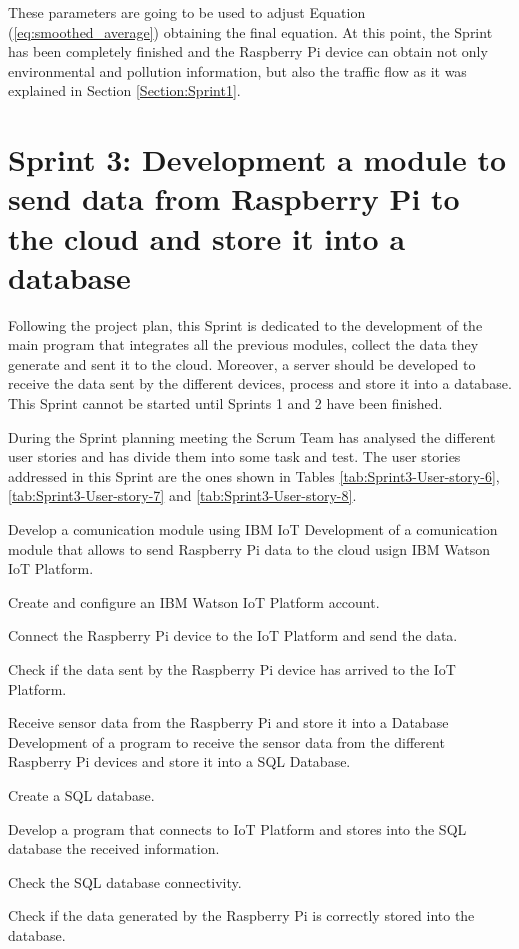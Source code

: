 These parameters are going to be used to adjust Equation (\ref{eq:smoothed_average}) obtaining the final equation. At this point, the Sprint has been completely finished and the Raspberry Pi device can obtain not only environmental and pollution information, but also the traffic flow as it was explained in Section \ref{Section:Sprint1}.


\section{Sprint 3: Development a module to send data from Raspberry Pi to the cloud and store it into a database}
Following the project plan, this Sprint is dedicated to the development of the main program that integrates all the previous modules, collect the data they generate and sent it to the cloud. Moreover, a server should be developed to receive the data sent by the different devices, process and store it into a database. This Sprint cannot be started until Sprints 1 and 2 have been finished.

During the Sprint planning meeting the Scrum Team has analysed the different user stories and has divide them into some task and test. The user stories addressed in this Sprint are the ones shown in Tables \ref{tab:Sprint3-User-story-6}, \ref{tab:Sprint3-User-story-7} and \ref{tab:Sprint3-User-story-8}.

{Develop a comunication module using IBM IoT}
{Development of a comunication module that allows to send Raspberry Pi data to the cloud usign IBM Watson IoT Platform.}
{	\item Create and configure an IBM Watson IoT Platform account.
	\item Connect the Raspberry Pi device to the IoT Platform and send the data.
}{	\item Check if the data sent by the Raspberry Pi device has arrived to the IoT Platform.
}

{Receive sensor data from the Raspberry Pi and store it into a Database}
{Development of a program to receive the sensor data from the different Raspberry Pi devices and store it into a SQL Database.}
{	\item Create a SQL database.
	\item Develop a program that connects to IoT Platform and stores into the SQL database the received information.
}{	\item Check the SQL database connectivity.
	\item Check if the data generated by the Raspberry Pi is correctly stored into the database.
}


